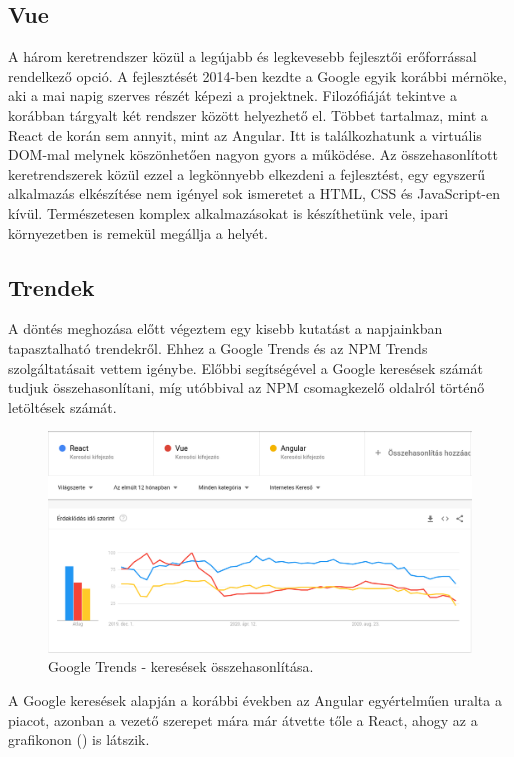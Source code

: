 \subsection{Vue}
A három keretrendszer közül a legújabb és legkevesebb fejlesztői erőforrással rendelkező opció.
A fejlesztését 2014-ben kezdte a Google egyik korábbi mérnöke, aki a mai napig szerves részét képezi a projektnek.
Filozófiáját tekintve a korábban tárgyalt két rendszer között helyezhető el. Többet tartalmaz, mint a React de korán sem annyit, mint az Angular. Itt is találkozhatunk a virtuális DOM-mal melynek köszönhetően nagyon gyors a működése.
Az összehasonlított keretrendszerek közül ezzel a legkönnyebb elkezdeni a fejlesztést, egy egyszerű alkalmazás elkészítése nem igényel sok ismeretet a HTML, CSS és JavaScript-en kívül. Természetesen komplex alkalmazásokat is készíthetünk vele, ipari környezetben is remekül megállja a helyét. 

\subsection{Trendek}
A döntés meghozása előtt végeztem egy kisebb kutatást a napjainkban tapasztalható trendekről. Ehhez a Google Trends és az NPM Trends szolgáltatásait vettem igénybe. Előbbi segítségével a Google keresések számát tudjuk összehasonlítani, míg utóbbival az NPM csomagkezelő oldalról történő letöltések számát.

\begin{figure}[!ht]
  \centering
  \includegraphics[width=150mm, keepaspectratio]{figures/google_trends.png}
  \caption{Google Trends - keresések összehasonlítása.}
  \label{fig:GoogleTrends}
\end{figure}

A Google keresések alapján a korábbi években az Angular egyértelműen uralta a piacot, azonban a vezető szerepet mára már átvette tőle a React, ahogy az a grafikonon () is látszik.

